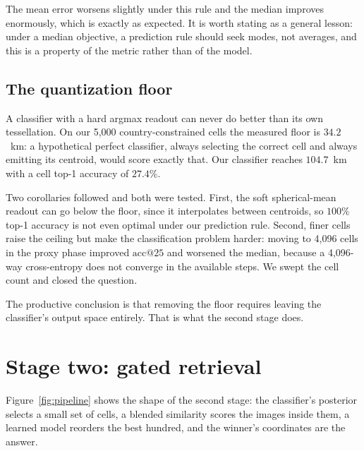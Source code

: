 \documentclass[11pt,a4paper]{article}
\begin{document}
The mean error worsens slightly under this rule and the median improves enormously, which is
exactly as expected. It is worth stating as a general lesson: under a median objective, a
prediction rule should seek modes, not averages, and this is a property of the metric rather
than of the model.

\subsection{The quantization floor}

A classifier with a hard argmax readout can never do better than its own tessellation. On our
5{,}000 country-constrained cells the measured floor is $34.2$~km: a hypothetical perfect
classifier, always selecting the correct cell and always emitting its centroid, would score
exactly that. Our classifier reaches $104.7$~km with a cell top-1 accuracy of $27.4\%$.

Two corollaries followed and both were tested. First, the soft spherical-mean readout can go
below the floor, since it interpolates between centroids, so $100\%$ top-1 accuracy is not
even optimal under our prediction rule. Second, finer cells raise the ceiling but make the
classification problem harder: moving to 4{,}096 cells in the proxy phase improved
$\mathrm{acc@}25$ and worsened the median, because a 4{,}096-way cross-entropy does not
converge in the available steps. We swept the cell count and closed the question.

The productive conclusion is that removing the floor requires leaving the classifier's output
space entirely. That is what the second stage does.

\section{Stage two: gated retrieval}

Figure~\ref{fig:pipeline} shows the shape of the second stage: the classifier's posterior
selects a small set of cells, a blended similarity scores the images inside them, a learned
model reorders the best hundred, and the winner's coordinates are the answer.
\end{document}
